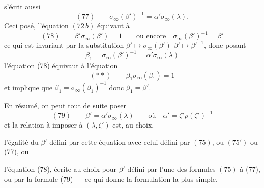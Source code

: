 \deleted{\[(77)\qquad\beta'\sigma_\infty(\beta')=1\]}
s'écrit aussi
\[
(77)\qquad\sigma_\infty(\beta')^{-1}=\alpha'\sigma_\infty(\lambda).
\]
Ceci posé, l'équation $(72\,b)$ équivaut à
\[
(78)\qquad\beta'\sigma_\infty(\beta')=1\qquad\text{ou encore}\quad\sigma_\infty(\beta')^{-1}=\beta'
\]
ce qui est invariant par la substitution $\beta'\mapsto\sigma_\infty(\beta')$  $\beta'\mapsto\beta'^{-1}$, donc posant
\[
\beta_1=\sigma_\infty(\beta')^{-1}=\alpha'\sigma_\infty(\lambda)
\]
l'équation (78) équivaut à l'équation
\[
(**)\qquad\beta_1\sigma_\infty(\beta_1)=1
\]
et implique que $\beta_1=\sigma_\infty(\beta_1)^{-1}$ donc $\beta_1=\beta'$.

En résumé, on peut tout de suite poser
\[
(79)\qquad\beta'=\alpha'\sigma_\infty(\lambda)\qquad\text{où}\quad\alpha'=\zeta'\rho(\zeta')^{-1}
\]
et la relation à imposer à $(\lambda,\zeta')$ est, au choix,

l'égalité du $\beta'$ défini par cette équation avec  celui défini par  $(75)$, ou $(75')$ ou (77), ou

l'équation (78), écrite au choix pour $\beta'$ défini par l'une des formules $(75)$ à (77), ou par la formule (79) --- ce qui donne la formulation la plus simple.

